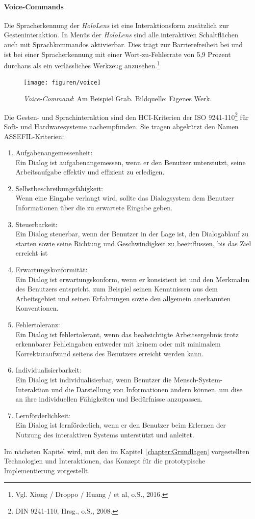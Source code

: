 \paragraph*{Voice-Commands} Die Spracherkennung der \textit{HoloLens} ist eine Interaktionsform zusätzlich zur Gesteninteraktion. In Menüs der \textit{HoloLens} sind alle interaktiven Schaltflächen auch mit Sprachkommandos aktivierbar. Dies trägt zur Barrierefreiheit bei und ist bei einer Spracherkennung mit einer Wort-zu-Fehlerrate von 5,9 Prozent durchaus als ein verlässliches Werkzeug anzusehen.\footnote{ Vgl. Xiong / Droppo / Huang / et al, o.S., 2016.}
\begin{figure}[H]
	\centering
	\texttt{[image: figuren/voice]}
	\caption{\textit{Voice-Command}: Am Beispiel \frqq Grab\flqq. Bildquelle: Eigenes Werk.}
	\label{fig:voice_command}
\end{figure}
Die Gesten- und Sprachinteraktion sind den HCI-Kriterien der ISO 9241-110\footnote{DIN 9241-110, Hrsg., o.S., 2008.} für Soft- und Hardwaresysteme nachempfunden. Sie tragen abgekürzt den Namen \frqq ASSEFIL\flqq-Kriterien:\begin{enumerate}
	\item Aufgabenangemessenheit:\\\frqq Ein Dialog ist aufgabenangemessen, wenn er den Benutzer unterstützt, seine Arbeitsaufgabe effektiv und effizient zu erledigen.\flqq
	\item Selbstbeschreibungsfähigkeit:\\\frqq Wenn eine Eingabe verlangt wird, sollte das Dialogsystem dem Benutzer Informationen über die zu erwartete Eingabe geben.\flqq
	\item Steuerbarkeit:\\\frqq Ein Dialog steuerbar, wenn der Benutzer in der Lage ist, den Dialogablauf zu starten sowie seine Richtung und Geschwindigkeit zu beeinflussen, bis das Ziel erreicht ist\flqq
	\item Erwartungskonformität:\\\frqq Ein Dialog ist erwartungskonform, wenn er konsistent ist und den Merkmalen des Benutzers entspricht, zum Beispiel seinen Kenntnissen aus dem Arbeitsgebiet und seinen Erfahrungen sowie den allgemein anerkannten Konventionen.\flqq
	\item Fehlertoleranz:\\\frqq Ein Dialog ist fehlertolerant, wenn das beabsichtigte Arbeitsergebnis trotz erkennbarer Fehleingaben entweder mit keinem oder mit minimalem Korrekturaufwand seitens des Benutzers erreicht werden kann.\flqq
	\item Individualisierbarkeit:\\\frqq Ein Dialog ist individualisierbar, wenn Benutzer die Mensch-System-Interaktion und die Darstellung von Informationen ändern können, um dise an ihre individuellen Fähigkeiten und Bedürfnisse anzupassen.\flqq
	\item Lernförderlichkeit:\\\frqq Ein Dialog ist lernförderlich, wenn er den Benutzer beim Erlernen der Nutzung des interaktiven Systems unterstützt und anleitet.\flqq
\end{enumerate}
Im nächsten Kapitel wird, mit den im Kapitel~\ref{chapter:Grundlagen} vorgestellten Technologien und Interaktionen, das Konzept für die prototypische Implementierung vorgestellt.
\newpage
